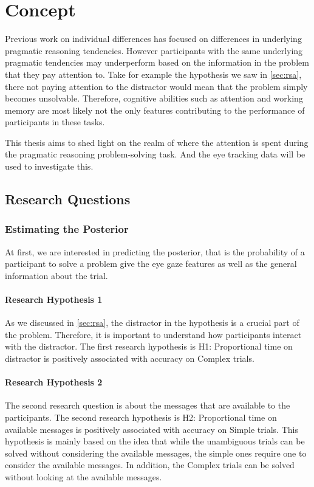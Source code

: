 ﻿\chapter{Concept}
 
Previous work on individual differences \cite{Franke_2016} has focused on differences in underlying pragmatic reasoning tendencies. However participants with the same underlying pragmatic tendencies may underperform based on the information in the problem that they pay attention to. Take for example the hypothesis we saw in \autoref{sec:rsa}, there not paying attention to the distractor would mean that the problem simply becomes unsolvable. Therefore, cognitive abilities such as attention and working memory are most likely not the only features contributing to the performance of participants in these tasks.

This thesis aims to shed light on the realm of where the attention is spent during the pragmatic reasoning problem-solving task. And the eye tracking data will be used to investigate this. 

\section{Research Questions}
\label{sec:research_questions}

\subsection{Estimating the Posterior}
\label{sec:posterior}
At first, we are interested in predicting the posterior, that is the probability of a participant to solve a problem give the eye gaze features as well as the general information about the trial.

\subsubsection{Research Hypothesis 1}
\label{sec:h1}
As we discussed in \autoref{sec:rsa}, the distractor in the hypothesis is a crucial part of the problem. Therefore, it is important to understand how participants interact with the distractor. The first research hypothesis is H1: Proportional time on distractor is positively associated with accuracy on Complex trials.

\subsubsection{Research Hypothesis 2}
\label{sec:h2}
The second research question is about the messages that are available to the participants. The second research hypothesis is H2: Proportional time on available messages is positively associated with accuracy on Simple trials. This hypothesis is mainly based on the idea that while the unambiguous trials can be solved without considering the available messages, the simple ones require one to consider the available messages. In addition, the Complex trials can be solved without looking at the available messages.

